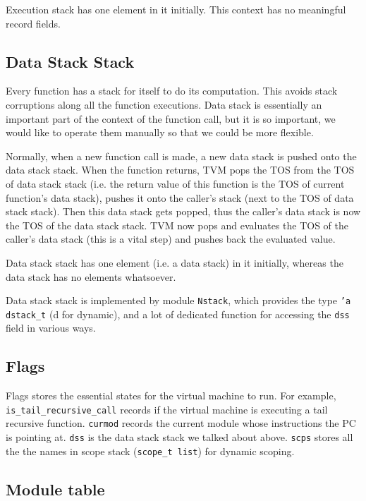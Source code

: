 \documentclass{article}
\begin{document}
Execution stack has one element in it initially. This context has no meaningful record fields.

\subsection{Data Stack Stack}

Every function has a stack for itself to do its computation. This avoids stack corruptions along all the function executions. Data stack is essentially an important part of the context of the function call, but it is so important, we would like to operate them manually so that we could be more flexible.

Normally, when a new function call is made, a new data stack is pushed onto the data stack stack. When the function returns, TVM pops the TOS from the TOS of data stack stack (i.e. the return value of this function is the TOS of current function's data stack), pushes it onto the caller's stack (next to the TOS of data stack stack). Then this data stack gets popped, thus the caller's data stack is now the TOS of the data stack stack. TVM now pops and evaluates the TOS of the caller's data stack (this is a vital step) and pushes back the evaluated value.

Data stack stack has one element (i.e. a data stack) in it initially, whereas the data stack has no elements whatsoever.

Data stack stack is implemented by module \texttt{Nstack}, which provides the type \texttt{'a dstack\_t} (d for dynamic), and a lot of dedicated function for accessing the \texttt{dss} field in various ways.

\subsection{Flags}

Flags stores the essential states for the virtual machine to run. For example, \texttt{is\_tail\_recursive\_call} records if the virtual machine is executing a tail recursive function. \texttt{curmod} records the current module whose instructions the PC is pointing at. \texttt{dss} is the data stack stack we talked about above. \texttt{scps} stores all the the names in scope stack (\texttt{scope\_t list}) for dynamic scoping.

\subsection{Module table}
\end{document}
